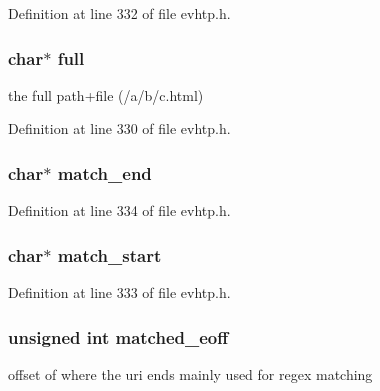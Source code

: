 Definition at line 332 of file evhtp.h.

\hypertarget{structevhtp__path__s_a3deff62337b4ec745307f4410d7ff6ce}{
\subsubsection[{full}]{\setlength{\rightskip}{0pt plus 5cm}char$\ast$ {\bf full}}}
\label{structevhtp__path__s_a3deff62337b4ec745307f4410d7ff6ce}
the full path+file (/a/b/c.html) 

Definition at line 330 of file evhtp.h.

\hypertarget{structevhtp__path__s_aa1f13c993b57860b101d02bc62bb801b}{
\subsubsection[{match\_\-end}]{\setlength{\rightskip}{0pt plus 5cm}char$\ast$ {\bf match\_\-end}}}
\label{structevhtp__path__s_aa1f13c993b57860b101d02bc62bb801b}


Definition at line 334 of file evhtp.h.

\hypertarget{structevhtp__path__s_a25d9dc60fbb26e1c4898184e1e46e9ab}{
\subsubsection[{match\_\-start}]{\setlength{\rightskip}{0pt plus 5cm}char$\ast$ {\bf match\_\-start}}}
\label{structevhtp__path__s_a25d9dc60fbb26e1c4898184e1e46e9ab}


Definition at line 333 of file evhtp.h.

\hypertarget{structevhtp__path__s_ae9fc73e1697747df74873f20d91db690}{
\subsubsection[{matched\_\-eoff}]{\setlength{\rightskip}{0pt plus 5cm}unsigned int {\bf matched\_\-eoff}}}
\label{structevhtp__path__s_ae9fc73e1697747df74873f20d91db690}
offset of where the uri ends mainly used for regex matching 

